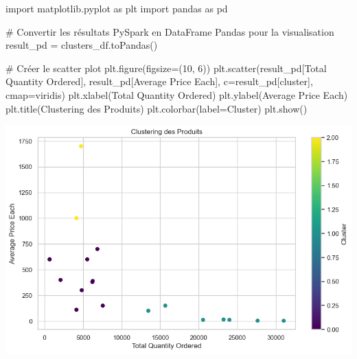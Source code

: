 \documentclass[
  letterpaper,
  DIV=11,
  numbers=noendperiod]{scrartcl}
\newenvironment{Shaded}{\begin{snugshade}}{\end{snugshade}}
\newcommand{\CommentTok}[1]{\textcolor[rgb]{0.37,0.37,0.37}{#1}}
\newcommand{\DecValTok}[1]{\textcolor[rgb]{0.68,0.00,0.00}{#1}}
\newcommand{\ImportTok}[1]{\textcolor[rgb]{0.00,0.46,0.62}{#1}}
\newcommand{\NormalTok}[1]{\textcolor[rgb]{0.00,0.23,0.31}{#1}}
\newcommand{\OperatorTok}[1]{\textcolor[rgb]{0.37,0.37,0.37}{#1}}
\newcommand{\StringTok}[1]{\textcolor[rgb]{0.13,0.47,0.30}{#1}}
\begin{document}
\begin{Shaded}
\begin{Highlighting}[]
\ImportTok{import}\NormalTok{ matplotlib.pyplot }\ImportTok{as}\NormalTok{ plt}
\ImportTok{import}\NormalTok{ pandas }\ImportTok{as}\NormalTok{ pd}

\CommentTok{\# Convertir les résultats PySpark en DataFrame Pandas pour la visualisation}
\NormalTok{result\_pd }\OperatorTok{=}\NormalTok{ clusters\_df.toPandas()}

\CommentTok{\# Créer le scatter plot}
\NormalTok{plt.figure(figsize}\OperatorTok{=}\NormalTok{(}\DecValTok{10}\NormalTok{, }\DecValTok{6}\NormalTok{))}
\NormalTok{plt.scatter(result\_pd[}\StringTok{\textquotesingle{}Total Quantity Ordered\textquotesingle{}}\NormalTok{], result\_pd[}\StringTok{\textquotesingle{}Average Price Each\textquotesingle{}}\NormalTok{], c}\OperatorTok{=}\NormalTok{result\_pd[}\StringTok{\textquotesingle{}cluster\textquotesingle{}}\NormalTok{], cmap}\OperatorTok{=}\StringTok{\textquotesingle{}viridis\textquotesingle{}}\NormalTok{)}
\NormalTok{plt.xlabel(}\StringTok{\textquotesingle{}Total Quantity Ordered\textquotesingle{}}\NormalTok{)}
\NormalTok{plt.ylabel(}\StringTok{\textquotesingle{}Average Price Each\textquotesingle{}}\NormalTok{)}
\NormalTok{plt.title(}\StringTok{\textquotesingle{}Clustering des Produits\textquotesingle{}}\NormalTok{)}
\NormalTok{plt.colorbar(label}\OperatorTok{=}\StringTok{\textquotesingle{}Cluster\textquotesingle{}}\NormalTok{)}
\NormalTok{plt.show()}
\end{Highlighting}
\end{Shaded}

\includegraphics{Projet_Spark_GIRONDIN_Audric_files/figure-pdf/cell-26-output-1.png}
\end{document}
